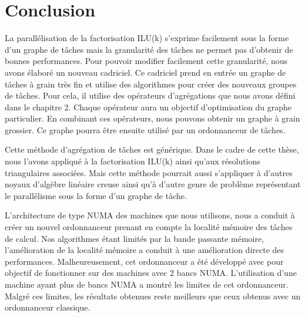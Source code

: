\section{Conclusion}
La parallélisation de la factorisation ILU(k) s'exprime facilement sous la forme d'un graphe de tâches mais la granularité des tâches ne permet pas d'obtenir de bonnes performances.
%
Pour pouvoir modifier facilement cette granularité, nous avons élaboré un nouveau cadriciel.
%
Ce cadriciel prend en entrée un graphe de tâches à grain très fin et utilise des algorithmes pour créer des nouveaux groupes de tâches.
%
Pour cela, il utilise des opérateurs d'agrégations que nous avons défini dans le chapitre 2.
%
Chaque opérateur aura un objectif d'optimisation du graphe particulier.
%
En combinant ces opérateurs, nous pouvons obtenir un graphe à grain grossier.
%
Ce graphe pourra être ensuite utilisé par un ordonnanceur de tâches.


Cette méthode d'agrégation de tâches est générique.
%
Dans le cadre de cette thèse, nous l'avons appliqué à la factorisation ILU(k) ainsi qu'aux résolutions triangulaires associées.
%
Mais cette méthode pourrait aussi s'appliquer à d'autres noyaux d'algèbre linéaire creuse ainsi qu'à d'autre genre de problème représentant le parallélisme sous la forme d'un graphe de tâche.


L'architecture de type NUMA des machines que nous utilisons, nous a conduit à créer un nouvel ordonnanceur prenant en compte la localité mémoire des tâches de calcul.
%
Nos algorithmes étant limités par la bande passante mémoire, l'amélioration de la localité mémoire a conduit à une amélioration directe des performances.
%
Malheureusement, cet ordonnanceur a été développé avec pour objectif de fonctionner sur des machines avec 2 bancs NUMA.
%
L'utilisation d'une machine ayant plus de bancs NUMA a montré les limites de cet ordonnanceur.
%
Malgré ces limites, les résultats obtenues reste meilleurs que ceux obtenus avec un ordonnanceur classique.
